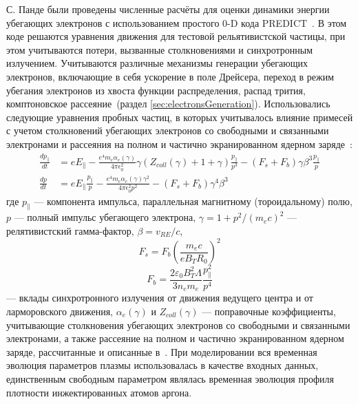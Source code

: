 С. Панде были проведены численные расчёты для оценки динамики энергии убегающих электронов с использованием простого 0-D кода PREDICT~\cite{Pandya2019,Patel2021}. В этом коде решаются уравнения движения для тестовой рельятивистской частицы, при этом учитываются потери, вызванные столкновениями и синхротронным излучением. Учитываются различные механизмы генерации убегающих электронов, включающие в себя ускорение в поле Дрейсера, переход в режим убегания электронов из хвоста функции распределения, распад трития, комптоновское рассеяние~(раздел \ref{sec:electronsGeneration}). Использовались следующие уравнения пробных частиц, в которых учитывалось влияние примесей с учетом столкновений убегающих электронов со свободными и связанными электронами и рассеяния на полном и частично экранированном ядерном заряде~\cite{MartinSolis2017,Shevelev2021,Matsuyama2017}:
\begin{equation*}
  \begin{alignedat}{1}
    \frac{ d p_{\parallel} }{ d t } & = e E_{\parallel} - \frac{ e^4 m_e \alpha_e(\gamma) }{ 4 \pi \epsilon_0^2 } \gamma ( Z_{coll}(\gamma) + 1 + \gamma ) \frac{ p_{\parallel} }{ p^3 } - ( F_s + F_b ) \gamma \beta^3 \frac{ p_{\parallel} }{p} \\
    \frac{ d p }{ d t } & = e E_{\parallel} \frac{ p_{\parallel} }{ p } - \frac{ e^4 m_e \alpha_e(\gamma) \gamma^2 }{ 4 \pi \epsilon_0^2 p^2 } - ( F_s + F_b ) \gamma^4 \beta^3 
  \end{alignedat}  
\end{equation*}
где $ p_{\parallel} $ --- компонента импульса, параллельная магнитному (тороидальному) полю, $p$ --- полный импульс убегающего электрона, $\gamma = 1 + p^2 / ( m_e c )^2$ --- релятивистский гамма-фактор, $\beta = v_{RE}/c$, 
\begin{equation*}
  F_s = F_b \left( \frac{ m_e c }{ e B_T R_0 } \right)^2
\end{equation*}
\begin{equation*}
  F_b = \frac{ 2 \varepsilon_0 B_T^2 \Lambda }{ 3 n_e m_e } \frac{ p_{\parallel}^2 }{ p^4 } 
\end{equation*}  
--- вклады синхротронного излучения от движения ведущего центра и от ларморовского движения, $\alpha_e(\gamma)$ и $Z_{coll}(\gamma)$ --- поправочные коэффициенты, учитывающие столкновения убегающих электронов со свободными и связанными электронами, а также рассеяние на полном и частично экранированном ядерном заряде, рассчитанные и описанные в~\cite{MartinSolis2017}. При моделировании вся временная эволюция параметров плазмы использовалась в качестве входных данных, единственным свободным параметром являлась временная эволюция профиля плотности инжектированных атомов аргона.

